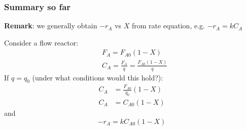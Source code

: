 \begin{comment}
	(c) Sketch of $X$ and $-r_A$ vs V?
	\begin{itemize}
		\item[(i)] Fix $X$, say $X = 0.2$
		\item[(ii)] Calculate $$V = F_{A0}\int_0^{0.2}\frac{dX}{-r_A}\approx218\text{dm}^3$$
		\item[(iii)] Increment $X$ and calculate new $V$, etc.
		\begin{table}
			\centering
			\begin{tabular}
				{|c|c|c|c} \hline $X$ & 0 & 0.2 & 0.4\\
				$-r_A$ & 0.45 & 0.30 &\\
				$V$ & 0 & 218 &\\
				\hline
			\end{tabular}
			$\leftarrow$ Given data,
		\end{table}
	\end{itemize}
\end{frame}

\begin{frame}\frametitle{PFR example}
	\begin{itemize}
		\item	{\color{blue}Ex 2-4} Comparison of CSTR and PFR sizes

		In general -

		For isothermal reactions of order $>$ zero, $-\frac{1}{r_A}$ vs $X$ curve is concave ??.

		\item	$\Rightarrow$ PFR will require a smaller volume than CSTR for same feed rate.
	\end{itemize}
\end{frame}
\end{comment}

\begin{frame}\frametitle{Summary so far}
	\textbf{Remark}: we generally obtain $-r_A$ vs $X$ from rate equation, e.g. $-r_A = kC_A$
	
	Consider a flow reactor:
	\begin{align*}
		&F_A = F_{A0}(1 - X)\\
		&C_A = \frac{F_A}{q} = \frac{F_{A0}(1 - X)}{q}
	\end{align*}
	If $q = q_0$ {\color{myGreen}(under what conditions would this hold?)}:
	\begin{align*}
		C_A &= \frac{F_{A0}}{q_0}(1 - X)\\
		C_A &= C_{A0}(1 - X)
	\end{align*}
	and $$-r_A = kC_{A0}(1 - X)$$
\end{frame}

